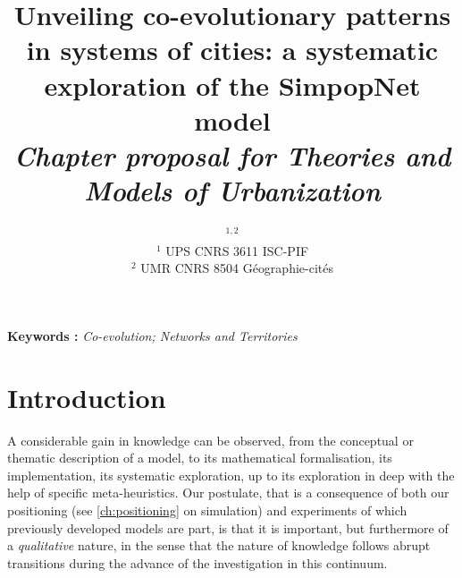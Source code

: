 


\title{Unveiling co-evolutionary patterns in systems of cities: a systematic exploration of the SimpopNet model
\\\medskip
\textit{Chapter proposal for Theories and Models of Urbanization}
}
\author{$^{1,2}$\\
$^1$ UPS CNRS 3611 ISC-PIF\\
$^2$ UMR CNRS 8504 G{\'e}ographie-cit{\'e}s
}
\date{}

\maketitle

\justify



\begin{abstract}

\end{abstract}

\textbf{Keywords : }\textit{Co-evolution; Networks and Territories}




\section{Introduction}


A considerable gain in knowledge can be observed, from the conceptual or thematic description of a model, to its mathematical formalisation, its implementation, its systematic exploration, up to its exploration in deep with the help of specific meta-heuristics. Our postulate, that is a consequence of both our positioning (see \ref{ch:positioning} on simulation) and experiments of which previously developed models are part, is that it is important, but furthermore of a \emph{qualitative} nature, in the sense that the nature of knowledge follows abrupt transitions during the advance of the investigation in this continuum.


